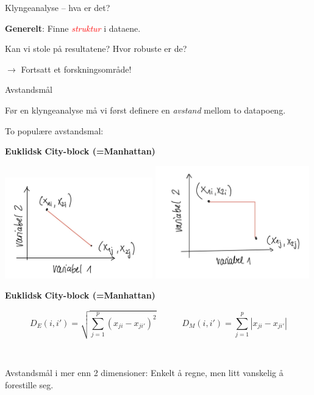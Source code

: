 \documentclass[10pt,ignorenonframetext,]{beamer}
\begin{document}
\begin{frame}{Klyngeanalyse -- hva er det?}
\protect\hypertarget{klyngeanalyse-hva-er-det-1}{}

\textbf{Generelt}: Finne \emph{\textcolor{red}{struktur}} i dataene.

\vspace{6mm}

Kan vi stole på resultatene? Hvor robuste er de?

\(\rightarrow\) Fortsatt et forskningsområde!

\end{frame}

\begin{frame}{Avstandsmål}
\protect\hypertarget{avstandsmuxe5l}{}

Før en klyngeanalyse må vi først definere en \emph{avstand} mellom to
datapoeng.

To populære avstandsmal:

\textbf{Euklidsk} \hspace{4cm} \textbf{City-block (=Manhattan)}

\includegraphics[width=0.48\textwidth,height=\textheight]{euklid.png}
\includegraphics[width=0.5\textwidth,height=\textheight]{manhattan.png}

\end{frame}

\begin{frame}

\textbf{Euklidsk} \hspace{4cm} \textbf{City-block (=Manhattan)}

\[D_E(i,i') = \sqrt{\sum_{j=1}^p (x_{ji} - x_{ji'})^2} \qquad \quad D_M(i,i') =  \sum_{j=1}^p |x_{ji} - x_{ji'}|\]

\(~\)

Avstandsmål i mer enn 2 dimensioner: Enkelt å regne, men litt vanskelig
å forestille seg.

\end{frame}
\end{document}
